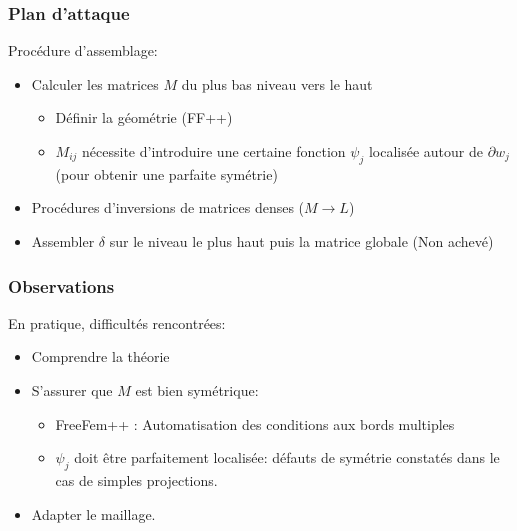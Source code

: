 \begin{frame}
  \frametitle{Plan d'attaque}
  Procédure d'assemblage:
  \begin{itemize}
  \item Calculer les matrices $M$ du plus bas niveau vers le haut
    \begin{itemize}
    \item Définir la géométrie (FF++) 
    \item $M_{ij}$ nécessite d'introduire une certaine fonction $\psi_j$ localisée autour de $\partial w_j$ (pour obtenir une parfaite symétrie)
    \end{itemize}
  \item Procédures d'inversions de matrices denses ($M \to L$)
  \item Assembler $\delta$ sur le  niveau le plus haut puis la  matrice globale (Non achevé)
  \end{itemize}
\end{frame}



\begin{frame}
  \frametitle{Observations}
  En pratique, difficultés rencontrées:
  \begin{itemize}
  \item Comprendre la théorie
  \item S'assurer que $M$ est bien symétrique:
    \begin{itemize}
    \item FreeFem++ : Automatisation des conditions aux bords multiples
    \item $\psi_j$ doit être parfaitement localisée: défauts de symétrie constatés dans le cas de simples projections.
    \end{itemize}
  \item Adapter le maillage.
  \end{itemize}
\end{frame}





